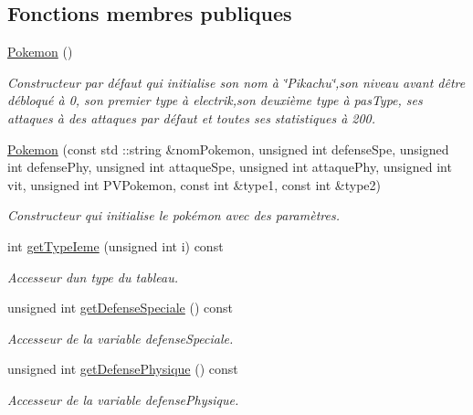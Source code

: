\subsection*{Fonctions membres publiques}
\begin{DoxyCompactItemize}
\item 
\mbox{\label{class_pokemon_a059e2fca08b08cd218c262f937399ed9}} 
\hyperlink{class_pokemon_a059e2fca08b08cd218c262f937399ed9}{Pokemon} ()
\begin{DoxyCompactList}\small\item\em Constructeur par défaut qui initialise son nom à \char`\"{}\+Pikachu\char`\"{},son niveau avant d\textquotesingle{}être débloqué à 0, son premier type à electrik,son deuxième type à pas\+Type, ses attaques à des attaques par défaut et toutes ses statistiques à 200. \end{DoxyCompactList}\item 
\hyperlink{class_pokemon_ae1906b0167eca061432bef507414de10}{Pokemon} (const std \+::string \&nom\+Pokemon, unsigned int defense\+Spe, unsigned int defense\+Phy, unsigned int attaque\+Spe, unsigned int attaque\+Phy, unsigned int vit, unsigned int P\+V\+Pokemon, const int \&type1, const int \&type2)
\begin{DoxyCompactList}\small\item\em Constructeur qui initialise le pokémon avec des paramètres. \end{DoxyCompactList}\item 
int \hyperlink{class_pokemon_a3d9cc7fe1b38d8d8ea3ef499116c0eac}{get\+Type\+Ieme} (unsigned int i) const
\begin{DoxyCompactList}\small\item\em Accesseur d\textquotesingle{}un type du tableau. \end{DoxyCompactList}\item 
unsigned int \hyperlink{class_pokemon_a5f932295f014353aeead20e0225b6eee}{get\+Defense\+Speciale} () const
\begin{DoxyCompactList}\small\item\em Accesseur de la variable defense\+Speciale. \end{DoxyCompactList}\item 
unsigned int \hyperlink{class_pokemon_a90e8c3b16d39995fcbcfd01834f57be7}{get\+Defense\+Physique} () const
\begin{DoxyCompactList}\small\item\em Accesseur de la variable defense\+Physique. \end{DoxyCompactList}\item 

\end{DoxyCompactItemize}
